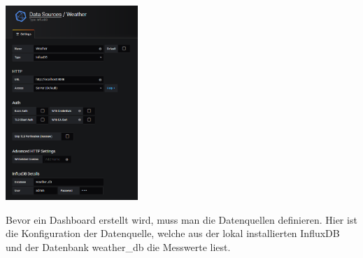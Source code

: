 \documentclass[
  12pt, %
  a4paper, %
  oneside, %
  openany, 
  numbers=noenddot, %
  BCOR=5mm, %
  parskip=half*, %
  thesis, %
]{bfhbook}
\begin{document}
\begin{center}
    \begin{minipage}[t]{0.45\textwidth}
        \centering
        \includegraphics[width=5cm, valign=t]{Bilder/Grafana-Datasource.PNG} %
        \captionsetup{justification=centering}
    \end{minipage}
    \begin{minipage}[t]{0.45\textwidth}
Bevor ein Dashboard erstellt wird, muss man die Datenquellen definieren. Hier ist die Konfiguration der Datenquelle, welche aus der lokal installierten InfluxDB und der Datenbank weather{\_}db die Messwerte liest.
    \end{minipage}
\end{center}
\end{document}
